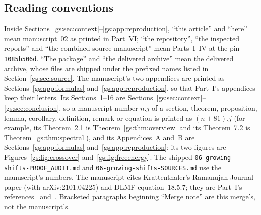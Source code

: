 \documentclass[11pt,a4paper]{article}
\numberwithin{equation}{section}
\theoremstyle{definition}
\theoremstyle{remark}
\begin{document}
\subsection{Reading conventions}\label{gs:sec:reading}
Inside Sections~\ref{gs:sec:context}--\ref{gs:app:reproduction}, ``this
article'' and ``here'' mean manuscript~02 as printed in Part~VI; ``the
repository'', ``the inspected reports'' and ``the combined source
manuscript'' mean Parts~I--IV at the pin \texttt{1085b506d}.  ``The
package'' and ``the delivered archive'' mean the delivered archive, whose
files are shipped under the prefixed names listed in
Section~\ref{gs:sec:source}.  The manuscript's two appendices are printed
as Sections~\ref{gs:app:formulas} and~\ref{gs:app:reproduction}, so that
Part~I's appendices keep their letters.  Its Sections~1--16 are
Sections~\ref{gs:sec:context}--\ref{gs:sec:conclusion}, so a manuscript
number $n.j$ of a section, theorem, proposition, lemma, corollary,
definition, remark or equation is printed as $(n+81).j$ (for example, its
Theorem~2.1 is Theorem~\ref{gs:thm:overview} and its Theorem~7.2 is
Theorem~\ref{gs:thm:spectral}), and its Appendices~A and~B are
Sections~\ref{gs:app:formulas} and~\ref{gs:app:reproduction}; its two
figures are Figures~\ref{gs:fig:crossover} and~\ref{gs:fig:freeenergy}.
The shipped \nolinkurl{06-growing-shifts-PROOF_AUDIT.md} and
\nolinkurl{06-growing-shifts-SOURCES.md} use the manuscript's numbers.  The
manuscript cites Krattenthaler's Ramanujan Journal paper (with
arXiv:2101.04225) and DLMF equation~18.5.7; they are Part~I's
references~\cite{Krattenthaler2023} and~\cite{DLMF}.  Bracketed paragraphs
beginning ``Merge note'' are this merge's, not the manuscript's.
\end{document}
